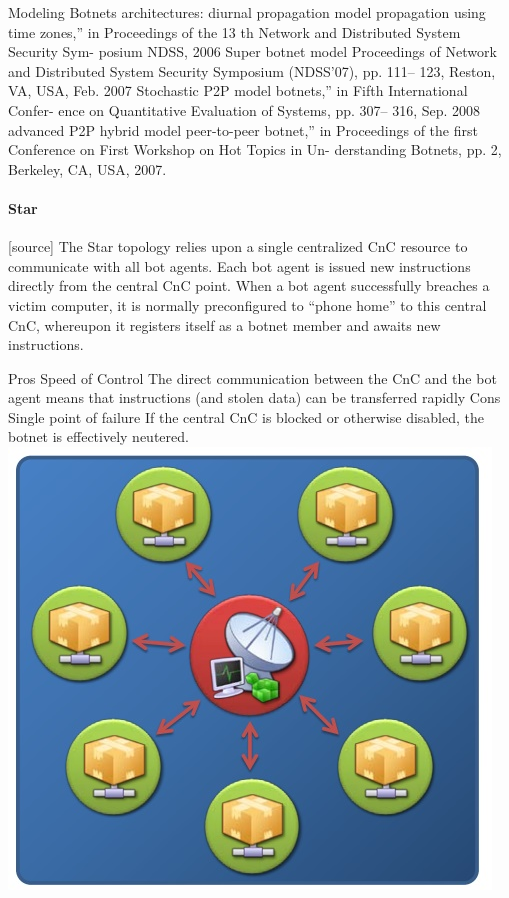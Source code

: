Modeling Botnets architectures:
diurnal propagation model %
propagation using time zones,” in Proceedings of the 13 th Network and Distributed System
Security Sym- posium NDSS, 2006
Super botnet model %
Proceedings of Network and Distributed System Security Symposium (NDSS’07), pp. 111–
123, Reston, VA, USA, Feb. 2007
Stochastic P2P model %
botnets,” in Fifth International Confer- ence on Quantitative Evaluation of Systems, pp. 307–
316, Sep. 2008 %
advanced P2P hybrid model %
peer-to-peer botnet,” in Proceedings of the first Conference on First Workshop on Hot Topics
in Un- derstanding Botnets, pp. 2, Berkeley, CA, USA, 2007.

\paragraph{Star}
[source]
The Star topology relies upon a single centralized CnC resource to communicate with
all bot agents. Each bot agent is issued new instructions directly from the central CnC
point. When a bot agent successfully breaches a victim computer, it is normally
preconfigured to “phone home” to this central CnC, whereupon it registers itself as a
botnet member and awaits new instructions.

    Pros 
Speed of Control
The direct communication between the CnC and the bot agent means that instructions (and stolen data) can be transferred rapidly
    Cons
Single point of failure
If the central CnC is blocked or otherwise disabled, the botnet is effectively neutered.\\
\includegraphics[scale=1]{img/star_topo.jpg}

